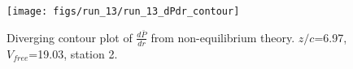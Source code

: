 \begin{figure}[H]
\centering
\texttt{[image: figs/run\_13/run\_13\_dPdr\_contour]}
\caption{Diverging contour plot of $\frac{d\bar{P}}{dr}$ from non-equilibrium theory. $z/c$=6.97, $V_{free}$=19.03, station 2.}
\label{fig:run_13_dPdr_contour}
\end{figure}


